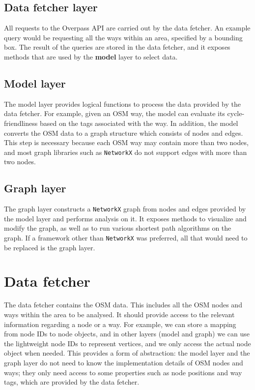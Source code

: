 \documentclass[12pt,a4paper]{report}
\begin{document}
\subsection{Data fetcher layer}
All requests to the Overpass API are carried out by the data fetcher. An example query would be requesting all the ways within an area, specified by a bounding box. The result of the queries are stored in the data fetcher, and it exposes methods that are used by the \textbf{model} layer to select data.

\subsection{Model layer}
The model layer provides logical functions to process the data provided by the data fetcher. For example, given an OSM way, the model can evaluate its cycle-friendliness based on the tags associated with the way. In addition, the model converts the OSM data to a graph structure which consists of nodes and edges. This step is necessary because each OSM way may contain more than two nodes, and most graph libraries such as \texttt{NetworkX} do not support edges with more than two nodes. 

\subsection{Graph layer}
The graph layer constructs a \texttt{NetworkX} graph from nodes and edges provided by the model layer and performs analysis on it. It exposes methods to visualize and modify the graph, as well as to run various shortest path algorithms on the graph. If a framework other than \texttt{NetworkX} was preferred, all that would need to be replaced is the graph layer.

\section{Data fetcher}
The data fetcher contains the OSM data. This includes all the OSM nodes and ways within the area to be analysed. It should provide access to the relevant information regarding a node or a way. For example, we can store a mapping from node IDs to node objects, and in other layers (model and graph) we can use the lightweight node IDs to represent vertices, and we only access the actual node object when needed. This provides a form of abstraction: the model layer and the graph layer do not need to know the implementation details of OSM nodes and ways; they only need access to some properties such as node positions and way tags, which are provided by the data fetcher.
\end{document}
